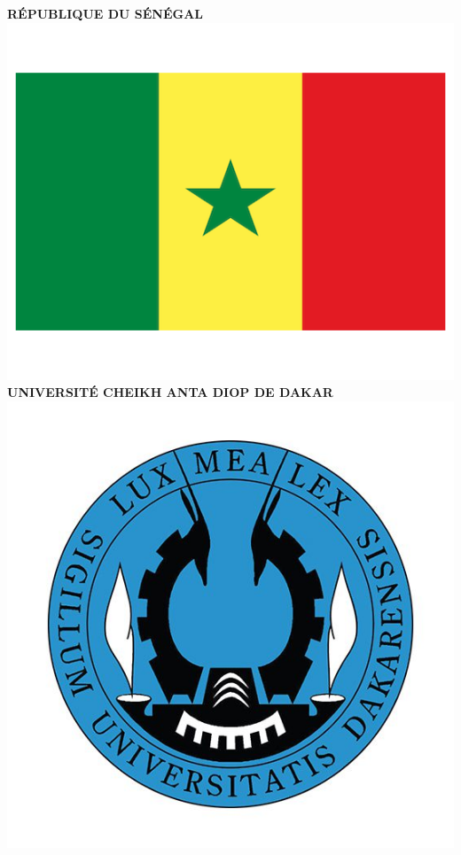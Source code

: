 \documentclass[a4paper, 12pt]{report}
\begin{document}
\begin{titlepage}

\centering %
 

\textsc{\normalsize \textbf{RÉPUBLIQUE DU SÉNÉGAL}}\\[0.15cm] %
\includegraphics[scale=.1]{img/flag}\\[0.15cm]
\textsc{\small \textbf{UNIVERSITÉ CHEIKH ANTA DIOP DE DAKAR}}\\[0.15cm]
\includegraphics[scale=.2]{img/ucad}\\[0.15cm] %

\end{titlepage}
\end{document}
